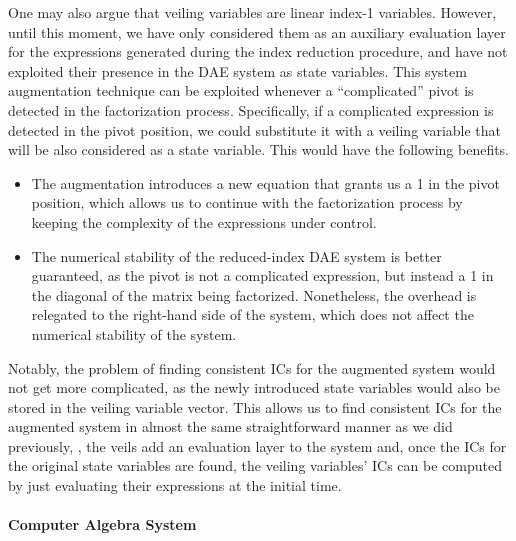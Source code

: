 One may also argue that veiling variables are linear index-1 variables. However, until this moment, we have only considered them as an auxiliary evaluation layer for the expressions generated during the index reduction procedure, and have not exploited their presence in the \ac{DAE} system as state variables. This system augmentation technique can be exploited whenever a ``complicated'' pivot is detected in the factorization process. Specifically, if a complicated expression is detected in the pivot position, we could substitute it with a veiling variable that will be also considered as a state variable. This would have the following benefits.
%
\begin{itemize}
  \setlength{\itemsep}{0pt}
  \item The augmentation introduces a new equation that grants us a 1 in the pivot position, which allows us to continue with the factorization process by keeping the complexity of the expressions under control.
  \item The numerical stability of the reduced-index \ac{DAE} system is better guaranteed, as the pivot is not a complicated expression, but instead a 1 in the diagonal of the matrix being factorized. Nonetheless, the overhead is relegated to the right-hand side of the system, which does not affect the numerical stability of the system.
\end{itemize}

Notably, the problem of finding consistent \acp{IC} for the augmented system would not get more complicated, as the newly introduced state variables would also be stored in the veiling variable vector. This allows us to find consistent \acp{IC} for the augmented system in almost the same straightforward manner as we did previously, \ie{}, the veils add an evaluation layer to the system and, once the \acp{IC} for the original state variables are found, the veiling variables' \acp{IC} can be computed by just evaluating their expressions at the initial time.

\paragraph{Computer Algebra System}

